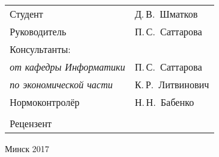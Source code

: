 \begin{titlepage}
\begin{center}
    \begin{tabular}{ p{}p{} }
      Студент & Д.\,В.~Шматков\\
      Руководитель & П.\,С.~Саттарова\\
      Консультанты: &\\
      \hspace*{3ex}\emph{от кафедры Информатики} & П.\,С.~Саттарова\\
      \hspace*{3ex}\emph{по экономической части} & К.\,Р.~Литвинович\\
      Нормоконтролёр & Н.\,Н.~Бабенко\\
      & \\
      Рецензент &
    \end{tabular}

    \vfill
    {\normalsize Минск 2017}
  \end{center}
\end{titlepage}

